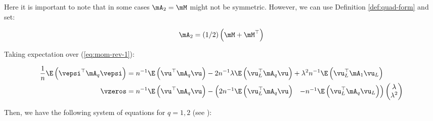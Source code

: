 \documentclass[english,12pt]{book}\usepackage[]{graphicx}\usepackage[]{xcolor}
\begin{document}
Here it is important to note that in some cases $\mA_2 = \mM$ might not be symmetric. However, we can use Definition \ref{def:quad-form} and set:

\begin{equation}\label{eq:trick-A2}
\mA_2 = (1/2)\left(\mM + \mM^\top\right)
\end{equation}

Taking expectation over (\ref{eq:mom-rev-1}):

\begin{equation*}
  \begin{aligned}
 \frac{1}{n}\E\left(\vepsi^\top\mA_q\vepsi\right) & = n^{-1}\E\left(\vu^\top\mA_q\vu \right) - 2n^{-1}\lambda\E\left(\vu_L^\top\mA_q\vu\right) + \lambda^2n^{-1}\E\left(\vu_L^\top\mA_1\vu_L\right) \\
 \vzeros & = n^{-1}\E\left(\vu^\top\mA_q\vu \right) - \begin{pmatrix}
                                                           2n^{-1}\E\left(\vu_L^\top\mA_q\vu\right) &   -n^{-1}\E\left(\vu_L^\top\mA_q\vu_L\right)  
                                                       \end{pmatrix}
                                                       \begin{pmatrix}
                                                        \lambda \\
                                                        \lambda^2
                                                       \end{pmatrix}
 \end{aligned}
\end{equation*}

Then,  we have the following system of equations for $q = 1, 2$ (see \citep[][pag 56]{kelejian2010specification}):
\end{document}

